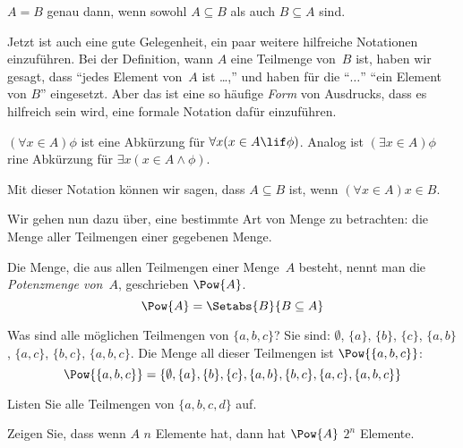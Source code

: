 \documentclass[../../../include/open-logic-section]{subfiles}
\begin{document}
\begin{prop}
$A = B$ genau dann, wenn sowohl $A \subseteq B$ als auch $B \subseteq A$ sind.
\end{prop}

Jetzt ist auch eine gute Gelegenheit, ein paar weitere
hilfreiche Notationen einzuführen. Bei der Definition, wann $A$ eine Teilmenge von~$B$ ist,
haben wir gesagt, dass
``jedes Element von~$A$ ist \dots,'' und haben für die ``$\dots$''
``ein Element von $B$'' eingesetzt. Aber das ist eine so häufige \emph{Form} von
Ausdrucks, dass es hilfreich sein wird, eine formale Notation dafür einzuführen.

\begin{defn}
$(\forall x \in A)\phi$ ist eine Abkürzung für $\forall x(x \in A \lif
\phi)$. Analog ist $(\exists x \in A)\phi$ rine Abkürzung für $\exists x(x
\in A \land \phi)$. 
\end{defn}

Mit dieser Notation können wir sagen, dass $A \subseteq B$ ist, wenn $(\forall
x \in A)x \in B$. 

Wir gehen nun dazu über, eine bestimmte Art von Menge zu betrachten: die Menge aller
Teilmengen einer gegebenen Menge. 

\begin{defn}[Potenzmenge]
Die Menge, die aus allen Teilmengen einer Menge~$A$ besteht, nennt man die
\emph{Potenzmenge von}~$A$, geschrieben $\Pow{A}$.
  \[
    \Pow{A} = \Setabs{B}{B \subseteq A} 
  \]
\end{defn}

\begin{ex}
Was sind alle möglichen Teilmengen von $\{ a, b, c \}$? Sie sind:
$\emptyset$, $\{a \}$, $\{b\}$, $\{c\}$, $\{a, b\}$, $\{a, c\}$, $\{b,
c\}$, $\{a, b, c\}$. Die Menge all dieser Teilmengen ist
$\Pow{\{a,b,c\}}$:
\[
\Pow{\{a, b, c \}} = \{\emptyset, \{a \}, \{b\}, \{c\}, \{a, b\},
\{b, c\}, \{a, c\}, \{a, b, c\}\}
\]
\end{ex}

\begin{prob}
Listen Sie alle Teilmengen von $\{a, b, c, d\}$ auf.
\end{prob}

\begin{prob}
Zeigen Sie, dass wenn $A$ $n$ Elemente hat, dann hat $\Pow{A}$ $2^n$
Elemente.
\end{prob}
\end{document}
